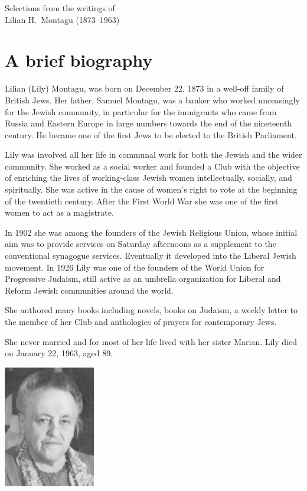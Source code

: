 \documentclass[14pt, article, extrafontsizes, twopage, a4paper]{memoir}
\begin{document}
{
  \centering
  \Large Selections from the writings of\\
  \LARGE Lilian H.\ Montagu (1873–1963)

}

\chapter{A brief biography}

Lilian (Lily) Montagu, was born on December 22, 1873 in a well-off family of British Jews. Her father, Samuel Montagu, was a banker who worked unceasingly for the Jewish community, in particular for the immigrants who came from Russia and Eastern Europe in large numbers towards the end of the nineteenth century. He became one of the first Jews to be elected to the British Parliament.

Lily was involved all her life in communal work for both the Jewish and the wider community. She worked as a social worker and founded a Club with the objective of enriching the lives of working-class Jewish women intellectually, socially, and spiritually. She was active in the cause of women's right to vote at the beginning of the twentieth century. After the First World War she was one of the first women to act as a magistrate.

In 1902 she was among the founders of the Jewish Religious Union, whose initial aim was to provide services on Saturday afternoons as a supplement to the conventional synagogue services. Eventually it developed into the Liberal Jewish movement. In 1926 Lily was one of the founders of the World Union for Progressive Judaism, still active as an umbrella organization for Liberal and Reform Jewish communities around the world.

She authored many books including novels, books on Judaism, a weekly letter to the member of her Club and anthologies of prayers for contemporary Jews.

She never married and for most of her life lived with her sister Marian. Lily died on January 22, 1963, aged 89.

{
  \centering
\includegraphics[width=4cm]{lilyolder.png}\\

}
\end{document}
